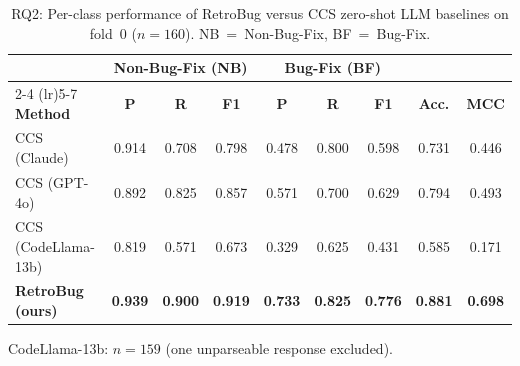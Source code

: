 
\begin{table}[t]
\centering
\scriptsize
\caption{RQ2: Per-class performance of RetroBug versus CCS zero-shot
LLM baselines on fold~0 ($n=160$).
NB~=~Non-Bug-Fix, BF~=~Bug-Fix.}
\label{tab:rq2}
\setlength{\tabcolsep}{3pt}
\renewcommand{\arraystretch}{0.9}
\begin{tabular}{@{}l ccc ccc cc@{}}
\toprule
 & \multicolumn{3}{c}{\textbf{Non-Bug-Fix (NB)}} & \multicolumn{3}{c}{\textbf{Bug-Fix (BF)}} & & \\
\cmidrule(lr){2-4} \cmidrule(lr){5-7}
\textbf{Method} & \textbf{P} & \textbf{R} & \textbf{F1} & \textbf{P} & \textbf{R} & \textbf{F1} & \textbf{Acc.} & \textbf{MCC} \\
\midrule
CCS (Claude)~\cite{zeng2025conventional}
  & 0.914 & 0.708 & 0.798 & 0.478 & 0.800 & 0.598 & 0.731 & 0.446 \\
\midrule
CCS (GPT-4o)~\cite{zeng2025conventional}
  & 0.892 & 0.825 & 0.857 & 0.571 & 0.700 & 0.629 & 0.794 & 0.493 \\
\midrule
CCS (CodeLlama-13b)~\cite{zeng2025conventional}
  & 0.819 & 0.571 & 0.673 & 0.329 & 0.625 & 0.431 & 0.585 & 0.171 \\
\midrule
\textbf{RetroBug (ours)}
  & \textbf{0.939} & \textbf{0.900} & \textbf{0.919} & \textbf{0.733} & \textbf{0.825} & \textbf{0.776} & \textbf{0.881} & \textbf{0.698} \\
\bottomrule
\end{tabular}

\vspace{0.3em}
{\footnotesize CodeLlama-13b: $n=159$ (one unparseable response excluded).}
\end{table}

